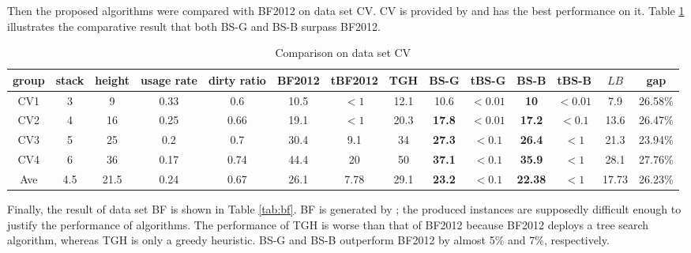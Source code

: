 \documentclass[review,3p,times,authoryear,12pt]{elsarticle}
\begin{document}
Then the proposed algorithms were compared with BF2012 on data set CV.
CV is provided by \cite{Caserta2009} and \cite{BF2012} has the best performance on it.
Table \ref{tab:cv} illustrates the comparative result that both BS-G and BS-B surpass BF2012.

\begin{table}[!htb]
\scriptsize
  \centering
  \caption{\label{tab:cv} Comparison on data set CV}
    \begin{tabular}{c|c|c|c|c|c|c|c|c|c|c|c|c|c}
    \hline
    group & stack & height & usage rate & dirty ratio & BF2012 & tBF2012 & TGH   & BS-G  & tBS-G & BS-B  & tBS-B & $\mathit{LB}$ & gap\\
    \hline
    CV1  & 3  & 9   & 0.33 & 0.6  & 10.5 & $<1$ & 12.1 & 10.6          & $<0.01$ & \textbf{10}   & $<0.01$ &7.9 & 26.58\%\\
    CV2  & 4  & 16  & 0.25 & 0.66 & 19.1 & $<1$ & 20.3 & \textbf{17.8} & $<0.01$ & \textbf{17.2} & $<0.1$ &13.6 & 26.47\%\\
    CV3  & 5  & 25  & 0.2  & 0.7  & 30.4 & 9.1  & 34   & \textbf{27.3} & $<0.1$  & \textbf{26.4} & $<1$   &21.3 & 23.94\%\\
    CV4  & 6  & 36  & 0.17 & 0.74 & 44.4 & 20   & 50   & \textbf{37.1} & $<0.1$  & \textbf{35.9} & $<1$   &28.1 & 27.76\%\\
    \hline
    Ave  & 4.5& 21.5& 0.24 & 0.67 & 26.1 & 7.78 & 29.1 & \textbf{23.2} & $<0.1$  & \textbf{22.38}& $<1$   & 17.73 & 26.23\%\\
    \hline
    \end{tabular}%
\end{table}%

Finally, the result of data set BF is shown in Table \ref{tab:bf}. BF is generated by \cite{BF2012}; the produced instances are supposedly difficult enough to justify the performance of algorithms. The performance of TGH is worse than that of BF2012 because BF2012 deploys a tree search algorithm, whereas TGH is only a greedy heuristic. BS-G and BS-B outperform BF2012 by almost 5\% and 7\%, respectively.
\end{document}
